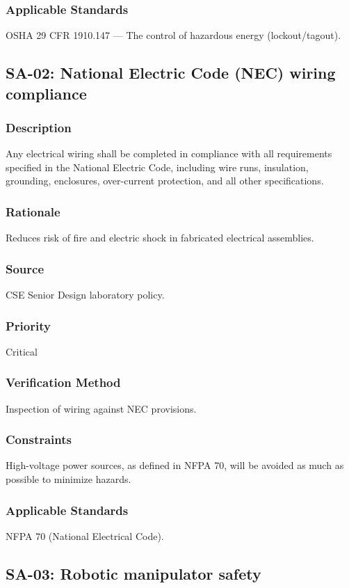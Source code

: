 \subsubsection{Applicable Standards}
OSHA 29 CFR 1910.147 --- The control of hazardous energy (lockout/tagout).

\subsection{SA-02: National Electric Code (NEC) wiring compliance}
\subsubsection{Description}
Any electrical wiring shall be completed in compliance with all requirements specified in the National Electric Code, including wire runs, insulation, grounding, enclosures, over-current protection, and all other specifications.
\subsubsection{Rationale}
Reduces risk of fire and electric shock in fabricated electrical assemblies.
\subsubsection{Source}
CSE Senior Design laboratory policy.
\subsubsection{Priority}
Critical
\subsubsection{Verification Method}
Inspection of wiring against NEC provisions.
\subsubsection{Constraints}
High-voltage power sources, as defined in NFPA 70, will be avoided as much as possible to minimize hazards.
\subsubsection{Applicable Standards}
NFPA 70 (National Electrical Code).

\subsection{SA-03: Robotic manipulator safety}
